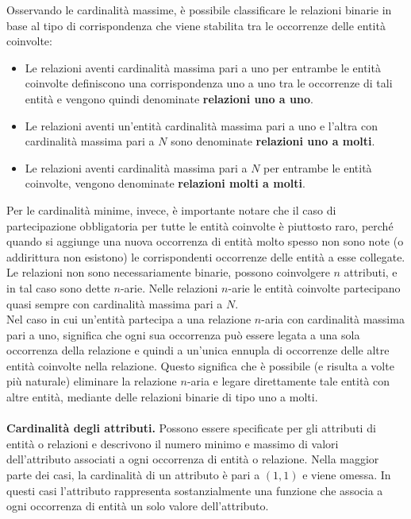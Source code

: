 Osservando le cardinalità massime, è possibile classificare le relazioni binarie in base al tipo di corrispondenza che viene stabilita tra le occorrenze delle entità coinvolte:  
    \begin{itemize}
        \item{Le relazioni aventi cardinalità massima pari a uno per entrambe le entità coinvolte definiscono una corrispondenza uno a uno tra le occorrenze di tali entità e vengono quindi denominate \textbf{relazioni uno a uno}.}
        \item{Le relazioni aventi un'entità cardinalità massima pari a uno e l'altra con cardinalità massima pari a $N$ sono denominate \textbf{relazioni uno a molti}.}
        \item{Le relazioni aventi cardinalità massima pari a $N$ per entrambe le entità coinvolte, vengono denominate \textbf{relazioni molti a molti}.}
    \end{itemize}
Per le cardinalità minime, invece, è importante notare che il caso di partecipazione obbligatoria per tutte le entità coinvolte è piuttosto raro, perché quando si aggiunge una nuova occorrenza di entità molto spesso non sono note (o addirittura non esistono) le corrispondenti occorrenze delle entità a esse collegate.\\
Le relazioni non sono necessariamente binarie, possono coinvolgere $n$ attributi, e in tal caso sono dette $n$-arie. Nelle relazioni $n$-arie le entità coinvolte partecipano quasi sempre con cardinalità massima pari a $N$.\\
Nel caso in cui un'entità partecipa a una relazione $n$-aria con cardinalità massima pari a uno, significa che ogni sua occorrenza può essere legata a una sola occorrenza della relazione e quindi a un'unica ennupla di occorrenze delle altre entità coinvolte nella relazione. Questo significa che è possibile (e risulta a volte più naturale) eliminare la relazione $n$-aria e legare direttamente tale entità con altre entità, mediante delle relazioni binarie di tipo uno a molti.\\\\
\textbf{Cardinalità degli attributi.} Possono essere specificate per gli attributi di entità o relazioni e descrivono il numero minimo e massimo di valori dell'attributo associati a ogni occorrenza di entità o relazione. Nella maggior parte dei casi, la cardinalità di un attributo è pari a $(1,1)$ e viene omessa. In questi casi l'attributo rappresenta sostanzialmente una funzione che associa a ogni occorrenza di entità un solo valore dell'attributo.\\
